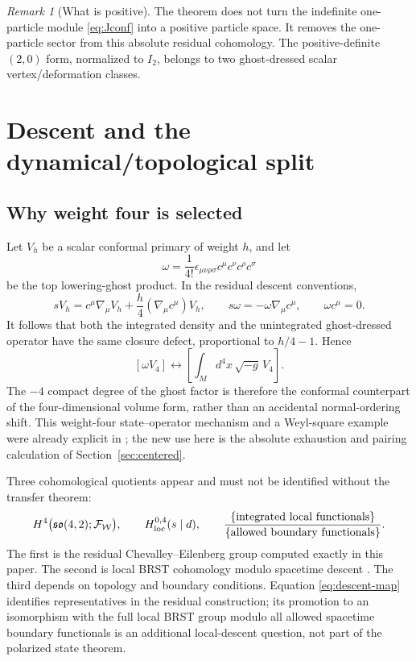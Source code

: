 \documentclass[11pt]{article}
\theoremstyle{definition}
\theoremstyle{remark}
\newtheorem{remark}[theorem]{Remark}
\newcommand{\W}{\mathcal W}
\newcommand{\F}{\mathcal F}
\begin{document}
\begin{remark}[What is positive]
The theorem does not turn the indefinite one-particle module
\eqref{eq:Jconf} into a positive particle space.  It removes the
one-particle sector from this absolute residual cohomology.  The
positive-definite $(2,0)$ form, normalized to $I_2$, belongs to two ghost-dressed
scalar vertex/deformation classes.
\end{remark}

\section{Descent and the dynamical/topological split}\label{sec:descent}

\subsection{Why weight four is selected}

Let $V_h$ be a scalar conformal primary of weight $h$, and let
\begin{equation}\label{eq:ghost-volume}
 \omega=\frac1{4!}\epsilon_{\mu\nu\rho\sigma}
 c^\mu c^\nu c^\rho c^\sigma
\end{equation}
be the top lowering-ghost product.  In the residual descent conventions,
\begin{equation}\label{eq:descent-transformations}
 sV_h=c^\mu\nabla_\mu V_h
 +\frac h4(\nabla_\mu c^\mu)V_h,
 \qquad
 s\omega=-\omega\nabla_\mu c^\mu,
 \qquad \omega c^\mu=0.
\end{equation}
It follows that both the integrated density and the unintegrated
ghost-dressed operator have the same closure defect,
proportional to $h/4-1$.  Hence
\begin{equation}\label{eq:descent-map}
 \boxed{[\omega V_4]\longleftrightarrow
 \left[\int_M d^4x\,\sqrt{-g}\,V_4\right].}
\end{equation}
The $-4$ compact degree of the ghost factor is therefore the conformal
counterpart of the four-dimensional volume form, rather than an accidental
normal-ordering shift.  This weight-four state--operator mechanism and a
Weyl-square example were already explicit in \cite{HamadaBRST}; the new use
here is the absolute exhaustion and pairing calculation of
Section~\ref{sec:centered}.

Three cohomological quotients appear and must not be identified without the
transfer theorem:
\begin{equation}\label{eq:three-cohomologies}
 H^4\bigl(\mathfrak{so}(4,2);\F_{\W}\bigr),
 \qquad
 H^{0,4}_{\rm loc}(s\mid d),
 \qquad
 \frac{\{\text{integrated local functionals}\}}
 {\{\text{allowed boundary functionals}\}}.
\end{equation}
The first is the residual Chevalley--Eilenberg group computed exactly in
this paper.  The second is local BRST cohomology modulo spacetime descent
\cite{BarnichBrandtHenneaux}.  The third depends on topology and boundary
conditions.  Equation \eqref{eq:descent-map} identifies representatives in
the residual construction; its promotion to an isomorphism with the full
local BRST group modulo all allowed spacetime boundary functionals is an
additional local-descent question, not part of the polarized state theorem.
\end{document}
